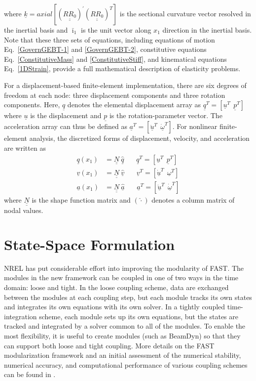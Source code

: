 \documentclass{aiaa-tc}
\newcommand{\tens}[1]{\underline{\underline{#1}}}
\renewcommand{\vec}[1]{\underline{#1}}
\begin{document}
where $\vec{k} = axial [(\tens{R R_0})^\prime (\tens{R R_0})^T]$ is the sectional
curvature vector resolved in the inertial basis and $\bar{\imath}_1$ is the unit
vector along $x_1$ direction in the inertial basis. Note that these
three sets of equations, including equations of motion
Eq.~\eqref{GovernGEBT-1} and \eqref{GovernGEBT-2}, constitutive equations
Eq.~\eqref{ConstitutiveMass} and \eqref{ConstitutiveStiff}, and kinematical
equations Eq.~\eqref{1DStrain}, provide a full mathematical description of elasticity problems. 

For a displacement-based finite-element implementation, there are six
degrees of freedom at each node: three displacement components and three
rotation components. Here, $\vec{q}$ denotes the elemental
displacement array as $\underline{q}^T=\left[
\underline{u}^T~~\underline{p}^T\right]$ where $\vec{u}$ is the
displacement and $\vec{p}$ is the rotation-parameter vector. The
acceleration array can thus be defined as $\underline{a}^T=\left[
\ddot{\underline{u}}^T~~ \dot{\underline{\omega}}^T \right]$. For nonlinear
finite-element analysis, the discretized forms of
displacement, velocity, and acceleration are written as
\begin{align}
	\label{DiscretizedDisp}
	\underline{q} (x_1) &= \underline{\underline{N}} ~\hat{\underline{q}}~~~~~~~~\underline{q}^T = \left[ \underline{u}^T~~\underline{p}^T \right] \\
	\label{DiscretizedVel}
	\underline{v}(x_1) &= \underline{\underline{N}}~\hat{\underline{v}}~~~~~~~~\underline{v}^T = \left[\underline{\dot{u}}^T~~\underline{\omega}^T \right] \\
	\label{DiscretizedAcc}
	\underline{a}(x_1) &= \underline{\underline{N}}~ \hat{\underline{a}}~~~~~~~~\underline{a}^T = \left[ \ddot{\underline{u}}^T~~\dot{\underline{\omega}}^T \right]	
\end{align}
where $\tens{N}$ is the shape function matrix and $(\hat{\cdot})$ denotes a
column matrix of nodal values.

\section{State-Space Formulation}
NREL has put considerable effort into improving the modularity of FAST. The modules in the new framework can be coupled in one of two ways in the time domain: loose and tight. In the loose coupling scheme, data are exchanged between the modules at each coupling step, but each module tracks its own states and integrates its own equations with its own solver. In a tightly coupled time-integration scheme, each module sets up its own equations, but the states are tracked and integrated by a solver common to all of the modules. To enable the most flexibility, it is useful to create modules (such as BeamDyn) so that they can support both loose and tight coupling. More details on the FAST modularization framework and an initial assessment of the numerical stability, numerical accuracy, and computational performance of various coupling schemes can be found in \cite{Jonkman:2013,Sprague:2013,Sprague:FAST2014}. 
\end{document}
